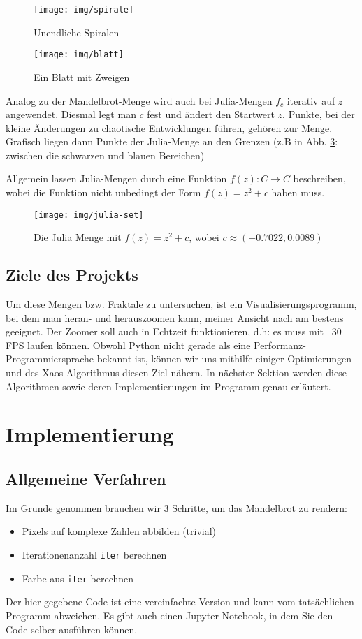 \documentclass{article}
\begin{document}
\begin{figure}
\centering
\texttt{[image: img/spirale]}
\caption{Unendliche Spiralen}
\label{fig:spiralen}
\end{figure}

\begin{figure}
\centering
\texttt{[image: img/blatt]}
\caption{Ein Blatt mit Zweigen}
\label{fig:blatt}
\end{figure}

Analog zu der Mandelbrot-Menge wird auch bei Julia-Mengen $f_c$ iterativ auf $z$ angewendet. Diesmal legt man $c$ fest und ändert den Startwert $z$. Punkte, bei der kleine Änderungen zu chaotische Entwicklungen führen, gehören zur Menge. Grafisch liegen dann Punkte der Julia-Menge an den Grenzen (z.B in Abb. \ref{fig:julia-set}: zwischen die schwarzen und blauen Bereichen) 

Allgemein lassen Julia-Mengen durch eine Funktion $f(z): C \rightarrow C$ beschreiben, wobei die Funktion nicht unbedingt der Form $f(z) = z^2 +c$ haben muss.

\begin{figure}[!htb]
\centering
\texttt{[image: img/julia-set]}
\caption{Die Julia Menge mit $f(z) = z^2 +c$, wobei $c \approx (-0.7022, 0.0089)$}
\label{fig:julia-set}
\end{figure}


\subsection{Ziele des Projekts}	
Um diese Mengen bzw. Fraktale zu untersuchen, ist ein Visualisierungsprogramm, bei dem man heran- und herauszoomen kann, meiner Ansicht nach am bestens geeignet. Der Zoomer soll auch in Echtzeit funktionieren, d.h: es muss mit ~30 FPS laufen können. Obwohl Python nicht gerade als eine Performanz-Programmiersprache bekannt ist, können wir uns mithilfe einiger Optimierungen und des Xaos-Algorithmus diesen Ziel nähern. In nächster Sektion werden diese Algorithmen sowie deren Implementierungen im Programm genau erläutert.

\section{Implementierung}
\subsection{Allgemeine Verfahren}
Im Grunde genommen brauchen wir 3 Schritte, um das Mandelbrot zu rendern:
\begin{itemize}
\item Pixels auf komplexe Zahlen abbilden (trivial)
\item Iterationenanzahl \lstinline|iter| berechnen
\item Farbe aus \lstinline|iter| berechnen
\end{itemize}
Der hier gegebene Code ist eine vereinfachte Version und kann vom tatsächlichen Programm abweichen. Es gibt auch einen Jupyter-Notebook, in dem Sie den Code selber ausführen können.
\end{document}
